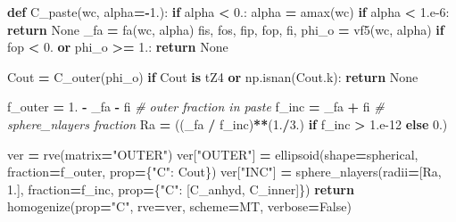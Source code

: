 \documentclass[
  a4paper,
  numbers=noendperiod,
  DIV=12]{scrreprt}
\newenvironment{Shaded}{\begin{snugshade}}{\end{snugshade}}
\newcommand{\CommentTok}[1]{\textcolor[rgb]{0.56,0.35,0.01}{\textit{#1}}}
\newcommand{\ControlFlowTok}[1]{\textcolor[rgb]{0.13,0.29,0.53}{\textbf{#1}}}
\newcommand{\FloatTok}[1]{\textcolor[rgb]{0.00,0.00,0.81}{#1}}
\newcommand{\KeywordTok}[1]{\textcolor[rgb]{0.13,0.29,0.53}{\textbf{#1}}}
\newcommand{\NormalTok}[1]{#1}
\newcommand{\OperatorTok}[1]{\textcolor[rgb]{0.81,0.36,0.00}{\textbf{#1}}}
\newcommand{\StringTok}[1]{\textcolor[rgb]{0.31,0.60,0.02}{#1}}
\newcommand{\VariableTok}[1]{\textcolor[rgb]{0.00,0.00,0.00}{#1}}
\begin{document}
\begin{Shaded}
\begin{Highlighting}[]
\KeywordTok{def}\NormalTok{ C\_paste(wc, alpha}\OperatorTok{={-}}\FloatTok{1.}\NormalTok{):}
    \ControlFlowTok{if}\NormalTok{ alpha }\OperatorTok{\textless{}} \FloatTok{0.}\NormalTok{: alpha }\OperatorTok{=}\NormalTok{ amax(wc)}
    \ControlFlowTok{if}\NormalTok{ alpha }\OperatorTok{\textless{}} \FloatTok{1.e{-}6}\NormalTok{: }\ControlFlowTok{return} \VariableTok{None}
\NormalTok{    \_fa }\OperatorTok{=}\NormalTok{ fa(wc, alpha)}
\NormalTok{    fis, fos, fip, fop, fi, phi\_o }\OperatorTok{=}\NormalTok{ vf5(wc, alpha)}
    \ControlFlowTok{if}\NormalTok{ fop }\OperatorTok{\textless{}} \FloatTok{0.} \KeywordTok{or}\NormalTok{ phi\_o }\OperatorTok{\textgreater{}=} \FloatTok{1.}\NormalTok{: }\ControlFlowTok{return} \VariableTok{None}

\NormalTok{    Cout }\OperatorTok{=}\NormalTok{ C\_outer(phi\_o)}
    \ControlFlowTok{if}\NormalTok{ Cout }\KeywordTok{is}\NormalTok{ tZ4 }\KeywordTok{or}\NormalTok{ np.isnan(Cout.k): }\ControlFlowTok{return} \VariableTok{None}

\NormalTok{    f\_outer }\OperatorTok{=} \FloatTok{1.} \OperatorTok{{-}}\NormalTok{ \_fa }\OperatorTok{{-}}\NormalTok{ fi       }\CommentTok{\# outer fraction in paste}
\NormalTok{    f\_inc   }\OperatorTok{=}\NormalTok{ \_fa }\OperatorTok{+}\NormalTok{ fi             }\CommentTok{\# sphere\_nlayers fraction}
\NormalTok{    Ra      }\OperatorTok{=}\NormalTok{ ((\_fa }\OperatorTok{/}\NormalTok{ f\_inc)}\OperatorTok{**}\NormalTok{(}\FloatTok{1.}\OperatorTok{/}\FloatTok{3.}\NormalTok{) }\ControlFlowTok{if}\NormalTok{ f\_inc }\OperatorTok{\textgreater{}} \FloatTok{1.e{-}12} \ControlFlowTok{else} \FloatTok{0.}\NormalTok{)}

\NormalTok{    ver }\OperatorTok{=}\NormalTok{ rve(matrix}\OperatorTok{=}\StringTok{"OUTER"}\NormalTok{)}
\NormalTok{    ver[}\StringTok{"OUTER"}\NormalTok{] }\OperatorTok{=}\NormalTok{ ellipsoid(shape}\OperatorTok{=}\NormalTok{spherical, fraction}\OperatorTok{=}\NormalTok{f\_outer,}
\NormalTok{                             prop}\OperatorTok{=}\NormalTok{\{}\StringTok{"C"}\NormalTok{: Cout\})}
\NormalTok{    ver[}\StringTok{"INC"}\NormalTok{]   }\OperatorTok{=}\NormalTok{ sphere\_nlayers(radii}\OperatorTok{=}\NormalTok{[Ra, }\FloatTok{1.}\NormalTok{],}
\NormalTok{                                  fraction}\OperatorTok{=}\NormalTok{f\_inc,}
\NormalTok{                                  prop}\OperatorTok{=}\NormalTok{\{}\StringTok{"C"}\NormalTok{: [C\_anhyd, C\_inner]\})}
    \ControlFlowTok{return}\NormalTok{ homogenize(prop}\OperatorTok{=}\StringTok{"C"}\NormalTok{, rve}\OperatorTok{=}\NormalTok{ver, scheme}\OperatorTok{=}\NormalTok{MT, verbose}\OperatorTok{=}\VariableTok{False}\NormalTok{)}
\end{Highlighting}
\end{Shaded}
\end{document}
